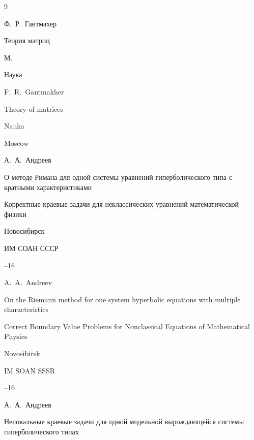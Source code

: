\begin{thebibliography}{9}




\by Ф.~Р.~Гантмахер

\book Теория матриц

\publaddr М.

\publ Наука



\misctransl

\by F.~R.~Gantmakher 

\book Theory of matrices

\publ Nauka

\publaddr Moscow








\by А.~А.~Андреев

\paper О методе Римана для одной системы уравнений гиперболического типа с кратными характеристиками

\inbook Корректные краевые задачи для неклассических уравнений математической физики

\publaddr Новосибирск

\publ ИМ СОАН СССР


--16

\misctransl

\by A.~A.~Andreev

\paper On the Riemann method for one system hyperbolic equations with multiple characteristics

\inbook Correct Boundary Value Problems for Nonclassical Equations of Mathematical Physics

\publaddr Novosibirsk

\publ IM SOAN SSSR 


--16






\by А.~А.~Андреев

\paper Нелокальные краевые задачи для одной модельной вырождающейся системы гиперболического типах


\end{thebibliography}
